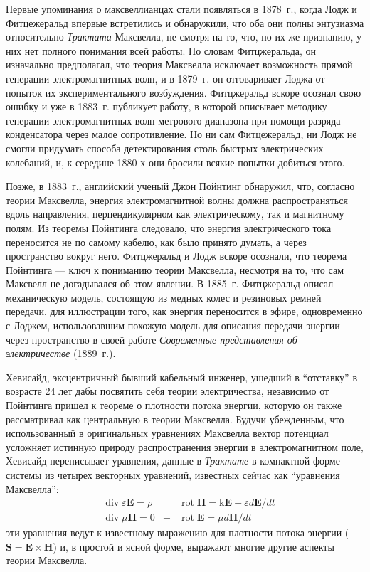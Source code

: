 \documentclass[12pt, oneside, a4paper]{article}
\begin{document}
Первые упоминания о максвеллианцах стали появляться в 1878~г., когда Лодж и Фитцежеральд впервые встретились и обнаружили, что оба они полны энтузиазма относительно \emph{Трактата} Максвелла, не смотря на то, что, по их же признанию, у них нет полного понимания всей работы. По словам Фитцжеральда, он изначально предполагал, что теория Максвелла исключает возможность прямой генерации электромагнитных волн, и в 1879~г. он отговаривает Лоджа от попыток их экспериментального возбуждения. Фитцжеральд вскоре осознал свою ошибку и уже в 1883~г. публикует работу, в которой описывает методику генерации электромагнитных волн метрового диапазона при помощи разряда конденсатора через малое сопротивление. Но ни сам Фитцежеральд, ни Лодж не смогли придумать способа детектирования столь быстрых электрических колебаний, и, к середине 1880-х они бросили всякие попытки добиться этого.

Позже, в 1883~г., английский ученый Джон Пойнтинг обнаружил, что, согласно теории Максвелла, энергия электромагнитной волны должна распространяться вдоль направления, перпендикулярном как электрическому, так и магнитному полям. Из теоремы Пойнтинга следовало, что энергия электрического тока переносится не по самому кабелю, как было принято думать, а через пространство вокруг него. Фитцжеральд и Лодж вскоре осознали, что теорема Пойнтинга --- ключ к пониманию теории Максвелла, несмотря на то, что сам Максвелл не догадывался об этом явлении. В 1885~г. Фитцжеральд описал  механическую модель, состоящую из медных колес и резиновых ремней передачи, для иллюстрации того, как энергия переносится в эфире, одновременно с  Лоджем, использовавшим похожую модель для описания передачи энергии через пространство в своей работе \emph{Современные представления об электричестве} (1889~г.).

Хевисайд, эксцентричный бывший кабельный инженер, ушедший в ``отставку'' в возрасте 24 лет дабы посвятить себя теории электричества, независимо от Пойнтинга пришел к теореме о плотности потока энергии, которую он также рассматривал как центральную в теории Максвелла. Будучи убежденным, что использованный в оригинальных уравнениях Максвелла вектор потенциал усложняет истинную природу распространения энергии в электромагнитном поле, Хевисайд переписывает уравнения, данные в \emph{Трактате} в компактной форме системы из четырех векторных уравнений, известных сейчас как ``уравнения Максвелла'':
\begin{align*}
&\operatorname{div}\varepsilon{}\mathbf{E} = \rho& 
&\operatorname{rot}\mathbf{H}=\mathrm{k}\mathbf{E} + \varepsilon{}d\mathbf{E}/dt\\
&\operatorname{div}\mu{}\mathbf{H}=0& 
-&\operatorname{rot}\mathbf{E}=\mu{}d\mathbf{H}/dt
\end{align*}
эти уравнения ведут к известному выражению для плотности потока энергии ($\mathbf{S}=\mathbf{E}\times\mathbf{H}$) и, в простой и ясной форме, выражают многие другие аспекты теории Максвелла.
\end{document}
